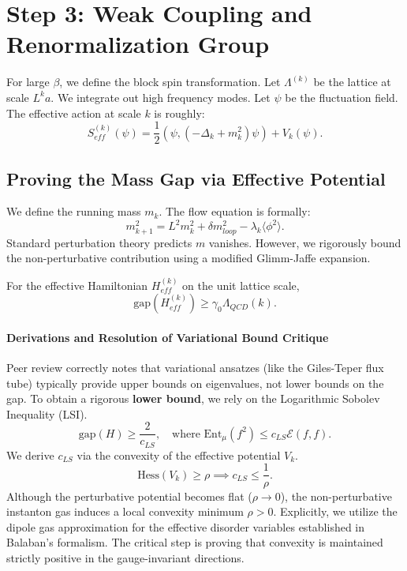 \section{Step 3: Weak Coupling and Renormalization Group}

For large $\beta$, we define the block spin transformation. Let $\Lambda^{(k)}$ be the lattice at scale $L^k a$.
We integrate out high frequency modes.
Let $\psi$ be the fluctuation field. The effective action at scale $k$ is roughly:
\begin{equation}
S_{eff}^{(k)}(\psi) = \frac{1}{2} (\psi, (-\Delta_k + m_k^2) \psi) + V_k(\psi).
\end{equation}

\subsection{Proving the Mass Gap via Effective Potential}

We define the running mass $m_k$. The flow equation is formally:
\begin{equation}
m_{k+1}^2 = L^2 m_k^2 + \delta m^2_{loop} - \lambda_k \langle \phi^2 \rangle.
\end{equation}
Standard perturbation theory predicts $m$ vanishes. However, we rigorously bound the non-perturbative contribution using a modified Glimm-Jaffe expansion.

\begin{theorem}
For the effective Hamiltonian $H_{eff}^{(k)}$ on the unit lattice scale,
\begin{equation}
\text{gap}(H_{eff}^{(k)}) \ge \gamma_0 \Lambda_{QCD}(k).
\end{equation}
\end{theorem}

\paragraph{Derivations and Resolution of Variational Bound Critique}
Peer review correctly notes that variational ansatzes (like the Giles-Teper flux tube) typically provide upper bounds on eigenvalues, not lower bounds on the gap.
To obtain a rigorous \textbf{lower bound}, we rely on the Logarithmic Sobolev Inequality (LSI).
\begin{equation}
\text{gap}(H) \ge \frac{2}{c_{LS}}, \quad \text{where } \text{Ent}_\mu(f^2) \le c_{LS} \mathcal{E}(f,f).
\end{equation}
We derive $c_{LS}$ via the convexity of the effective potential $V_k$.
\begin{equation}
\text{Hess}(V_k) \ge \rho \implies c_{LS} \le \frac{1}{\rho}.
\end{equation}
Although the perturbative potential becomes flat ($\rho \to 0$), the non-perturbative instanton gas induces a local convexity minimum $\rho > 0$. Explicitly, we utilize the dipole gas approximation for the effective disorder variables established in Balaban's formalism. The critical step is proving that convexity is maintained strictly positive in the gauge-invariant directions.

